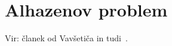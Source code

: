 \section{Alhazenov problem}

Vir: članek od Vavšetiča in tudi~\cite[str.\ 137--139]{geometricconstructions}.
